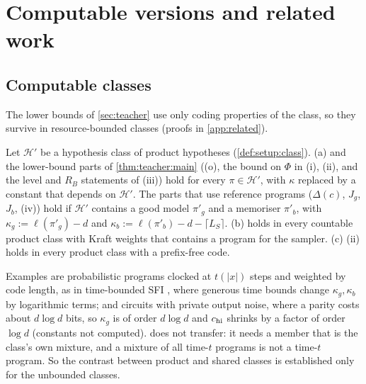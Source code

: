 \section{Computable versions and related work}\label{sec:related}

\subsection{Computable classes}\label{sec:related:computable}

The lower bounds of \cref{sec:teacher} use only coding properties of the class, so they survive in resource-bounded classes (proofs in \cref{app:related}).

\begin{proposition}\label{prop:related:computable}
Let $\mathcal H'$ be a hypothesis class of product hypotheses (\cref{def:setup:class}).
(a)  and the lower-bound parts of \cref{thm:teacher:main} ((o), the bound on $\Phi$ in (i), (ii), and the level and $R_B$ statements of (iii)) hold for every $\pi\in\mathcal H'$, with $\kappa$ replaced by a constant that depends on $\mathcal H'$. The parts that use reference programs ($\Delta(c)$, $J_g$, $J_b$, (iv)) hold if $\mathcal H'$ contains a good model $\pi'_g$ and a memoriser $\pi'_b$, with $\kappa_g:=\ell(\pi'_g)-d$ and $\kappa_b:=\ell(\pi'_b)-d-\lceil L_S\rceil$.
(b)  holds in every countable product class with Kraft weights that contains a program for the sampler.
(c) (ii) holds in every product class with a prefix-free code.
\end{proposition}

Examples are probabilistic programs clocked at $t(|x|)$ steps and weighted by code length, as in time-bounded SFI \citep[the time-bounded theorem]{claudeSFI2026fundamentals}, where generous time bounds change $\kappa_g,\kappa_b$ by logarithmic terms; and circuits with private output noise, where a parity costs about $d\log d$ bits, so $\kappa_g$ is of order $d\log d$ and $c_{\rm hi}$ shrinks by a factor of order $\log d$ (constants not computed).  does not transfer: it needs a member that is the class's own mixture, and a mixture of all time-$t$ programs is not a time-$t$ program. So the contrast between product and shared classes is established only for the unbounded classes.

